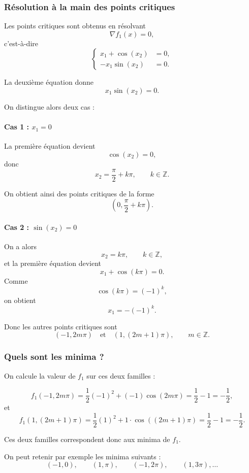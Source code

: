 \documentclass[a4paper,12pt]{article}
\begin{document}
	\subsubsection{Résolution à la main des points critiques}
	
	Les points critiques sont obtenus en résolvant
	\[
	\nabla f_1(x)=0,
	\]
	c’est-à-dire
	\[
	\left\{
	\begin{aligned}
	x_1+\cos(x_2)&=0,\\
	-x_1\sin(x_2)&=0.
	\end{aligned}
	\right.
	\]
	
	La deuxième équation donne
	\[
	x_1\sin(x_2)=0.
	\]
	
	On distingue alors deux cas :
	
	\paragraph{Cas 1 : \(x_1=0\)}
	La première équation devient
	\[
	\cos(x_2)=0,
	\]
	donc
	\[
	x_2=\frac{\pi}{2}+k\pi,\qquad k\in\mathbb{Z}.
	\]
	
	On obtient ainsi des points critiques de la forme
	\[
	\left(0,\frac{\pi}{2}+k\pi\right).
	\]
	
	\paragraph{Cas 2 : \(\sin(x_2)=0\)}
	On a alors
	\[
	x_2=k\pi,\qquad k\in\mathbb{Z},
	\]
	et la première équation devient
	\[
	x_1+\cos(k\pi)=0.
	\]
	Comme
	\[
	\cos(k\pi)=(-1)^k,
	\]
	on obtient
	\[
	x_1=-(-1)^k.
	\]
	
	Donc les autres points critiques sont
	\[
	(-1,2m\pi)\quad \text{et} \quad (1,(2m+1)\pi),\qquad m\in\mathbb{Z}.
	\]
	
	\subsubsection{Quels sont les minima ?}
	
	On calcule la valeur de \(f_1\) sur ces deux familles :
	
	\[
	f_1(-1,2m\pi)=\frac12(-1)^2+(-1)\cos(2m\pi)=\frac12-1=-\frac12,
	\]
	et
	\[
	f_1(1,(2m+1)\pi)=\frac12(1)^2+1\cdot\cos((2m+1)\pi)=\frac12-1=-\frac12.
	\]
	
	Ces deux familles correspondent donc aux minima de \(f_1\).
	
	On peut retenir par exemple les minima suivants :
	\[
	(-1,0),\qquad (1,\pi),\qquad (-1,2\pi),\qquad (1,3\pi),\dots
	\]
	
\end{document}

